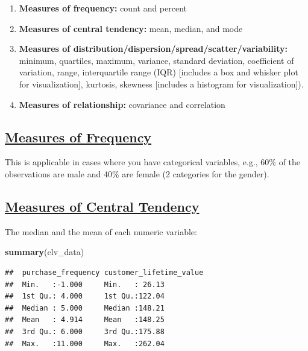 \documentclass[
]{article}
\newenvironment{Shaded}{\begin{snugshade}}{\end{snugshade}}
\newcommand{\FunctionTok}[1]{\textcolor[rgb]{0.13,0.29,0.53}{\textbf{#1}}}
\newcommand{\NormalTok}[1]{#1}
\begin{document}
\begin{enumerate}
\def\labelenumi{\arabic{enumi}.}
\item
  \textbf{Measures of frequency:} count and percent
\item
  \textbf{Measures of central tendency:} mean, median, and mode
\item
  \textbf{Measures of
  distribution/dispersion/spread/scatter/variability:} minimum,
  quartiles, maximum, variance, standard deviation, coefficient of
  variation, range, interquartile range (IQR) {[}includes a box and
  whisker plot for visualization{]}, kurtosis, skewness {[}includes a
  histogram for visualization{]}).
\item
  \textbf{Measures of relationship:} covariance and correlation
\end{enumerate}

\subsection{\texorpdfstring{\ul{\textbf{Measures of
Frequency}}}{Measures of Frequency}}\label{measures-of-frequency}

This is applicable in cases where you have categorical variables, e.g.,
60\% of the observations are male and 40\% are female (2 categories for
the gender).

\subsection{\texorpdfstring{\ul{\textbf{Measures of Central
Tendency}}}{Measures of Central Tendency}}\label{measures-of-central-tendency}

The median and the mean of each numeric variable:

\begin{Shaded}
\begin{Highlighting}[]
\FunctionTok{summary}\NormalTok{(clv\_data)}
\end{Highlighting}
\end{Shaded}

\begin{verbatim}
##  purchase_frequency customer_lifetime_value
##  Min.   :-1.000     Min.   : 26.13         
##  1st Qu.: 4.000     1st Qu.:122.04         
##  Median : 5.000     Median :148.21         
##  Mean   : 4.914     Mean   :148.25         
##  3rd Qu.: 6.000     3rd Qu.:175.88         
##  Max.   :11.000     Max.   :262.04
\end{verbatim}
\end{document}
